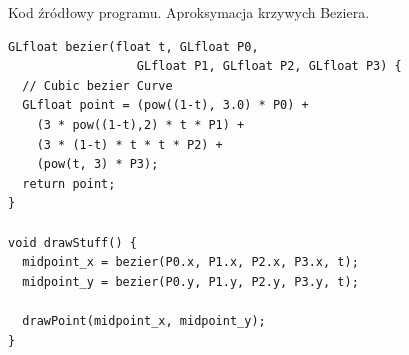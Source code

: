 \begin{table}[H]
\caption{Kod źródłowy programu. Aproksymacja krzywych Beziera.}
\label{tab2}
\begin{lstlisting}[frame=single]
GLfloat bezier(float t, GLfloat P0,
                  GLfloat P1, GLfloat P2, GLfloat P3) {
  // Cubic bezier Curve
  GLfloat point = (pow((1-t), 3.0) * P0) +
    (3 * pow((1-t),2) * t * P1) +
    (3 * (1-t) * t * t * P2) +
    (pow(t, 3) * P3);
  return point;
}

void drawStuff() {
  midpoint_x = bezier(P0.x, P1.x, P2.x, P3.x, t);
  midpoint_y = bezier(P0.y, P1.y, P2.y, P3.y, t);

  drawPoint(midpoint_x, midpoint_y);
}
\end{lstlisting}
\end{table}

\newpage



